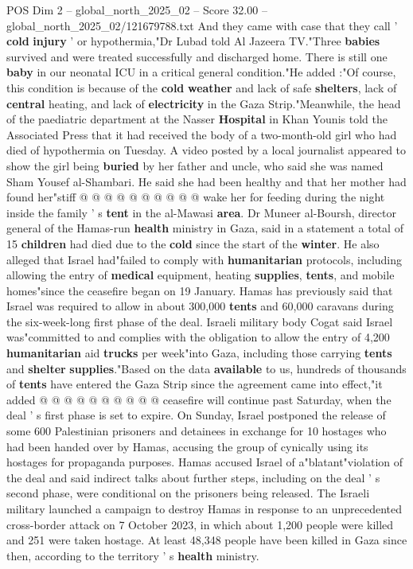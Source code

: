\begin{textsample}{POS Dim 2 – global\_north\_2025\_02 – Score 32.00 – global\_north\_2025\_02/121679788.txt}
And they came with case that they call ' \textbf{cold} \textbf{injury} ' or hypothermia,"Dr Lubad told Al Jazeera TV."Three \textbf{babies} survived and were treated successfully and discharged home.
There is still one \textbf{baby} in our neonatal ICU in a critical general condition."He added :"Of course, this condition is because of the \textbf{cold} \textbf{weather} and lack of safe \textbf{shelters}, lack of \textbf{central} heating, and lack of \textbf{electricity} in the Gaza Strip."Meanwhile, the head of the paediatric department at the Nasser \textbf{Hospital} in Khan Younis told the Associated Press that it had received the body of a two-month-old girl who had died of hypothermia on Tuesday.
A video posted by a local journalist appeared to show the girl being \textbf{buried} by her father and uncle, who said she was named Sham Yousef al-Shambari.
He said she had been healthy and that her mother had found her"stiff @ @ @ @ @ @ @ @ @ @ wake her for feeding during the night inside the family ' s \textbf{tent} in the al-Mawasi \textbf{area}.
Dr Muneer al-Boursh, director general of the Hamas-run \textbf{health} ministry in Gaza, said in a statement a total of 15 \textbf{children} had died due to the \textbf{cold} since the start of the \textbf{winter}.
He also alleged that Israel had"failed to comply with \textbf{humanitarian} protocols, including allowing the entry of \textbf{medical} equipment, heating \textbf{supplies}, \textbf{tents}, and mobile homes"since the ceasefire began on 19 January.
Hamas has previously said that Israel was required to allow in about 300,000 \textbf{tents} and 60,000 caravans during the six-week-long first phase of the deal.
Israeli military body Cogat said Israel was"committed to and complies with the obligation to allow the entry of 4,200 \textbf{humanitarian} aid \textbf{trucks} per week"into Gaza, including those carrying \textbf{tents} and \textbf{shelter} \textbf{supplies}."Based on the data \textbf{available} to us, hundreds of thousands of \textbf{tents} have entered the Gaza Strip since the agreement came into effect,"it added @ @ @ @ @ @ @ @ @ @ ceasefire will continue past Saturday, when the deal ' s first phase is set to expire.
On Sunday, Israel postponed the release of some 600 Palestinian prisoners and detainees in exchange for 10 hostages who had been handed over by Hamas, accusing the group of cynically using its hostages for propaganda purposes.
Hamas accused Israel of a"blatant"violation of the deal and said indirect talks about further steps, including on the deal ' s second phase, were conditional on the prisoners being released.
The Israeli military launched a campaign to destroy Hamas in response to an unprecedented cross-border attack on 7 October 2023, in which about 1,200 people were killed and 251 were taken hostage.
At least 48,348 people have been killed in Gaza since then, according to the territory ' s \textbf{health} ministry.


\end{textsample}
